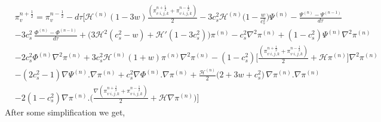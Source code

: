 \documentclass[a4paper,11pt]{article}
\begin{document}
\begin{align} 
 &\pi_v ^{n+\frac{1}{2}}=\pi_v ^{n-\frac{1}{2}} - d \tau \Big [ \mathcal{H}^{(n)} (1-3w)\frac{(\pi_{v  \; {i,j,k}}^{n+\frac{1}{2}} +\pi_{v \; {i,j,k}}^{n-\frac{1}{2}} )}{2} -3 {c_s^2 \mathcal{H}^{(n)}}\Big( 1- \frac{w}{c_s^2} \Big )\Psi^{(n) }
 -  \frac{{\Psi}^{(n)}-{\Psi}^{(n-1)} }{d \tau}
    \nonumber
     \\
      &
      - 3c_s^2  \, \frac{{\Phi}^{(n)}-{\Phi}^{(n-1)} }{d \tau}    
   +\Big( 3\mathcal{H}^2 (c_s^2 -w) + \mathcal{H}' (1-3c_s^2) \Big) \pi^{(n)}   - c_s^2 {\nabla^2 \pi ^{(n)}}  
   + (1-c_s^2)\Psi^{(n)} {\nabla^{2} \pi^{(n)}  }    
          \nonumber
     \\
      &
    - 2 c_s^2  \Phi ^{(n)}  {\nabla^2 \pi^{(n)}}
     + {3 c_s^2  \mathcal{H}^{(n)} (1+w) }\pi^{(n)} {\nabla^2 \pi^{(n)} }   
     -  (1-c_s^2)
 \Big[ \frac{(\pi_{v  \; {i,j,k}}^{n+\frac{1}{2}} +\pi_{v \; {i,j,k}}^{n-\frac{1}{2}} )}{2}  + \mathcal{H} \pi^{(n)} \Big] {\nabla^2  \pi^{(n)}} 
        \nonumber
     \\
       &
    - (2 c_s^2-1) {\nabla  \Psi^{(n)}  . \nabla \pi ^{(n)} }
    + c_s^2 {\nabla  \Phi ^{(n)} . \nabla \pi^{(n)}  }                %
              +\frac{\mathcal{H}^{(n)}} {2 } \Big(2+3w+c_s^2  \Big) \,{\nabla  \pi^{(n)} . \nabla \pi^{(n)} }  
                           \nonumber
     \\
       &
          -2(1-c_s^2) \nabla  \pi^{(n)} .  \Big( \frac{{ \nabla  ( \pi_{v  \; {i,j,k}}^{n+\frac{1}{2}} +\pi_{v \; {i,j,k}}^{n-\frac{1}{2}} ) }  } {2}  + \mathcal{H}  \nabla\pi^{(n)} \Big) 
    \Big]
\end{align}
After some simplification we get,
\end{document}
